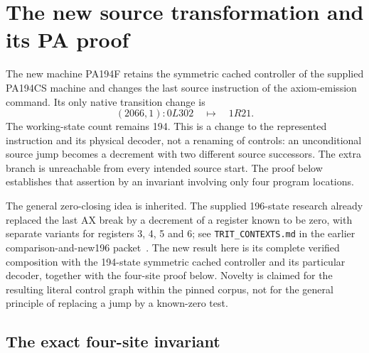 \section{The new source transformation and its PA proof}
\label{sec:pa194f-proof}

The new machine PA194F retains the symmetric cached controller of the
supplied PA194CS machine and changes the last source instruction of the
axiom-emission command. Its only native transition change is
\[
                  (2066,1):0L302\quad\longmapsto\quad1R21.
\]
The working-state count remains 194. This is a change to the represented
instruction and its physical decoder, not a renaming of controls: an
unconditional source jump becomes a decrement with two different source
successors. The extra branch is unreachable from every intended source
start. The proof below establishes that assertion by an invariant involving
only four program locations.


The general zero-closing idea is inherited. The supplied 196-state
research already replaced the last AX break by a decrement of a register
known to be zero, with separate variants for registers 3, 4, 5 and 6;
see \texttt{TRIT\_CONTEXTS.md} in the earlier comparison-and-new196
packet~\cite{closing}. The new result here is its complete verified composition with
the 194-state symmetric cached controller and its particular decoder,
together with the four-site proof below. Novelty is claimed for the
resulting literal control graph within the pinned corpus, not for the
general principle of replacing a jump by a known-zero test.

\subsection{The exact four-site invariant}

